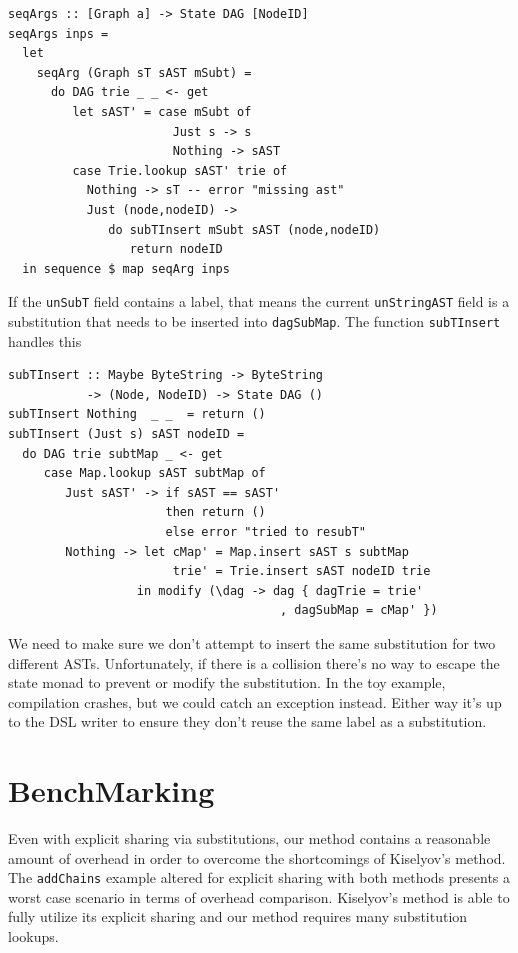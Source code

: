 \documentclass[runningheads]{llncs}
\begin{document}
\begin{verbatim}
seqArgs :: [Graph a] -> State DAG [NodeID]
seqArgs inps =
  let
    seqArg (Graph sT sAST mSubt) =
      do DAG trie _ _ <- get
         let sAST' = case mSubt of
                       Just s -> s
                       Nothing -> sAST
         case Trie.lookup sAST' trie of
           Nothing -> sT -- error "missing ast"
           Just (node,nodeID) ->
              do subTInsert mSubt sAST (node,nodeID)
                 return nodeID
  in sequence $ map seqArg inps
\end{verbatim}

If the \texttt{unSubT} field contains a label, that means the
current \texttt{unStringAST} field is a substitution that needs to
be inserted into \texttt{dagSubMap}. The function
\texttt{subTInsert} handles this

\begin{verbatim}
subTInsert :: Maybe ByteString -> ByteString
           -> (Node, NodeID) -> State DAG ()
subTInsert Nothing  _ _  = return ()
subTInsert (Just s) sAST nodeID =
  do DAG trie subtMap _ <- get
     case Map.lookup sAST subtMap of
        Just sAST' -> if sAST == sAST'
                      then return ()
                      else error "tried to resubT"
        Nothing -> let cMap' = Map.insert sAST s subtMap
                       trie' = Trie.insert sAST nodeID trie
                  in modify (\dag -> dag { dagTrie = trie'
                                      , dagSubMap = cMap' })
\end{verbatim}

We need to make sure we don't attempt to insert the same substitution for two
different ASTs. Unfortunately, if there is a collision there's no way to escape
the state monad to prevent or modify the substitution. In the toy example,
compilation crashes, but we could catch an exception instead. Either way it's up
to the DSL writer to ensure they don't reuse the same label as a substitution.

\section{BenchMarking}

Even with explicit sharing via substitutions, our method contains a reasonable
amount of overhead in order to overcome the shortcomings of Kiselyov's method.
The \texttt{addChains} example altered for explicit sharing with
both methods presents a worst case scenario in terms of overhead comparison.
Kiselyov's method is able to fully utilize its explicit sharing and our method
requires many substitution lookups.
\end{document}
